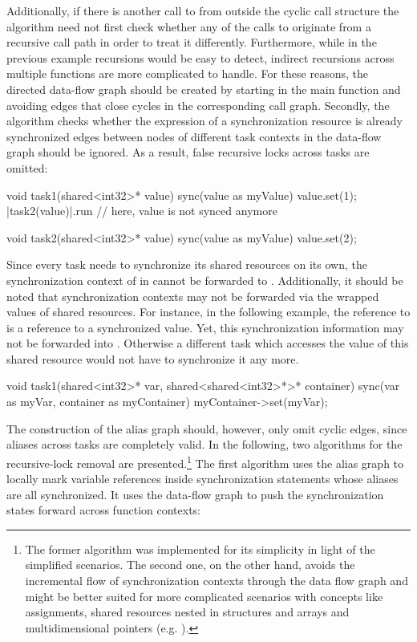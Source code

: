 Additionally, if there is another call to  from outside the cyclic call structure the algorithm need not first check whether any of the calls to  originate from a recursive call path in order to treat it differently. Furthermore, while in the previous example recursions would be easy to detect, indirect recursions across multiple functions are more complicated to handle. For these reasons, the directed data-flow graph should be created by starting in the main function and avoiding edges that close cycles in the corresponding call graph. Secondly, the algorithm checks whether the expression of a synchronization resource is already synchronized edges between nodes of different task contexts in the data-flow graph should be ignored. As a result, false recursive locks across tasks are omitted:
\begin{ccode}
void task1(shared<int32>* value) {
  sync(value as myValue) { value.set(1); 
    |task2(value)|.run                   // here, value is not synced anymore
  }
}

void task2(shared<int32>* value) {
  sync(value as myValue) { value.set(2); }
}
\end{ccode}
Since every task needs to synchronize its shared resources on its own, the synchronization context of  in  cannot be forwarded to . Additionally, it should be noted that synchronization contexts may not be forwarded via the wrapped values of shared resources. For instance, in the following example, the reference to  is a reference to a synchronized value. Yet, this synchronization information may not be forwarded into . Otherwise a different task which accesses the value of this shared resource would not have to synchronize it any more.
\begin{ccode}
void task1(shared<int32>* var, shared<shared<int32>*>* container) {
  sync(var as myVar, container as myContainer) {
    myContainer->set(myVar);
  }
}
\end{ccode}
The construction of the alias graph should, however, only omit cyclic edges, since aliases across tasks are completely valid. In the following, two algorithms for the recursive-lock removal are presented.\footnote{The former algorithm was implemented for its simplicity in light of the simplified scenarios. The second one, on the other hand, avoids the incremental flow of synchronization contexts through the data flow graph and might be better suited for more complicated scenarios with concepts like assignments, shared resources nested in structures and arrays and multidimensional pointers (e.g. ).} The first algorithm uses the alias graph to locally mark variable references inside synchronization statements whose aliases are all synchronized. It uses the data-flow graph to push the synchronization states forward across function contexts:

